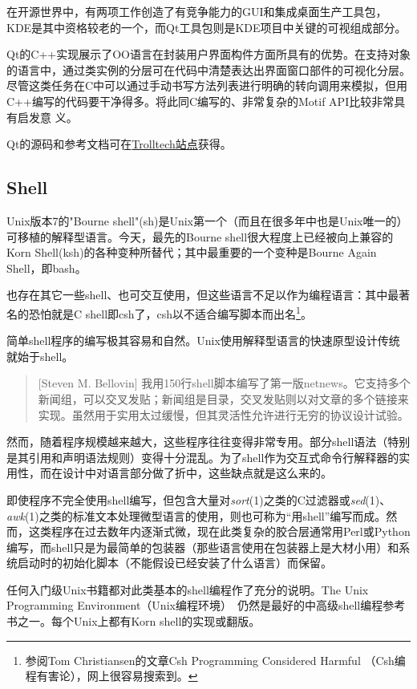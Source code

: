 \documentclass[12pt,oneside]{ctexbook}
\begin{document}
\begin{common-format}
在开源世界中，有两项工作创造了有竞争能力的GUI和集成桌面生产工具包，KDE是其中资格较老的一个，而Qt工具包则是KDE项目中关键的可视组成部分。

Qt的C++实现展示了OO语言在封装用户界面构件方面所具有的优势。在支持对象的语言中，通过类实例的分层可在代码中清楚表达出界面窗口部件的可视化分层。尽管这类任务在C中可以通过手动书写方法列表进行明确的转向调用来模拟，但用C++编写的代码要干净得多。将此同C编写的、非常复杂的Motif API比较非常具有启发意
义。

Qt的源码和参考文档可在\href{http://www.trolltech.com/}{Trolltech站点}获得。

\subsection{Shell}
Unix版本7的"Bourne shell"(sh)是Unix第一个（而且在很多年中也是Unix唯一的）可移植的解释型语言。今天，最先的Bourne shell很大程度上已经被向上兼容的Korn Shell(ksh)的各种变种所替代；其中最重要的一个变种是Bourne Again Shell，即bash。

也存在其它一些shell、也可交互使用，但这些语言不足以作为编程语言：其中最著名的恐怕就是C shell即csh了，csh以不适合编写脚本而出名\footnote{参阅Tom Christiansen的文章Csh Programming Considered Harmful （Csh编程有害论），网上很容易搜索到。}。

简单shell程序的编写极其容易和自然。Unix使用解释型语言的快速原型设计传统就始于shell。

\begin{quote}[Steven M. Bellovin]
我用150行shell脚本编写了第一版netnews。它支持多个新闻组，可以交叉发贴；新闻组是目录，交叉发贴则以对文章的多个链接来实现。虽然用于实用太过缓慢，但其灵活性允许进行无穷的协议设计试验。
\end{quote}

然而，随着程序规模越来越大，这些程序往往变得非常专用。部分shell语法（特别是其引用和声明语法规则）变得十分混乱。为了shell作为交互式命令行解释器的实用性，而在设计中对语言部分做了折中，这些缺点就是这么来的。

即使程序不完全使用shell编写，但包含大量对\textit{sort}(1)之类的C过滤器或\textit{sed}(1)、\textit{awk}(1)之类的标准文本处理微型语言的使用，则也可称为“用shell”编写而成。然而，这类程序在过去数年内逐渐式微，现在此类复杂的胶合层通常用Perl或Python编写，而shell只是为最简单的包装器（那些语言使用在包装器上是大材小用）和系统启动时的初始化脚本（不能假设已经安装了什么语言）而保留。

任何入门级Unix书籍都对此类基本的shell编程作了充分的说明。The Unix Programming Environment（Unix编程环境）~\cite{Kernighan-Pike84}仍然是最好的中高级shell编程参考书之一。每个Unix上都有Korn shell的实现或翻版。


\end{common-format}
\end{document}
